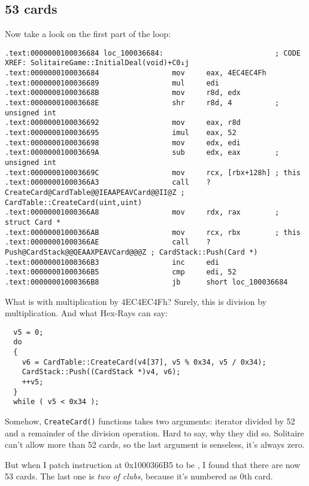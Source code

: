\subsection{53 cards}

\renewcommand{\CURPATH}{examples/solitaire/53}

Now take a look on the first part of the loop:

\begin{lstlisting}
.text:0000000100036684 loc_100036684:                          ; CODE XREF: SolitaireGame::InitialDeal(void)+C0↓j
.text:0000000100036684                 mov     eax, 4EC4EC4Fh
.text:0000000100036689                 mul     edi
.text:000000010003668B                 mov     r8d, edx
.text:000000010003668E                 shr     r8d, 4          ; unsigned int
.text:0000000100036692                 mov     eax, r8d
.text:0000000100036695                 imul    eax, 52
.text:0000000100036698                 mov     edx, edi
.text:000000010003669A                 sub     edx, eax        ; unsigned int
.text:000000010003669C                 mov     rcx, [rbx+128h] ; this
.text:00000001000366A3                 call    ?CreateCard@CardTable@@IEAAPEAVCard@@II@Z ; CardTable::CreateCard(uint,uint)
.text:00000001000366A8                 mov     rdx, rax        ; struct Card *
.text:00000001000366AB                 mov     rcx, rbx        ; this
.text:00000001000366AE                 call    ?Push@CardStack@@QEAAXPEAVCard@@@Z ; CardStack::Push(Card *)
.text:00000001000366B3                 inc     edi
.text:00000001000366B5                 cmp     edi, 52
.text:00000001000366B8                 jb      short loc_100036684
\end{lstlisting}

What is with multiplication by 4EC4EC4Fh? Surely, this is division by multiplication.
And what Hex-Rays can say:

\begin{lstlisting}
  v5 = 0;
  do
  {
    v6 = CardTable::CreateCard(v4[37], v5 % 0x34, v5 / 0x34);
    CardStack::Push((CardStack *)v4, v6);
    ++v5;
  }
  while ( v5 < 0x34 );
\end{lstlisting}

Somehow, \verb|CreateCard()| functions takes two arguments: iterator divided by 52 and a remainder of the division operation.
Hard to say, why they did so.
Solitaire can't allow more than 52 cards, so the last argument is senseless, it's always zero.

But when I patch  instruction at 0x1000366B5 to be , I found that there are now 53 cards.
The last one is \textit{two of clubs}, because it's numbered as 0th card.

